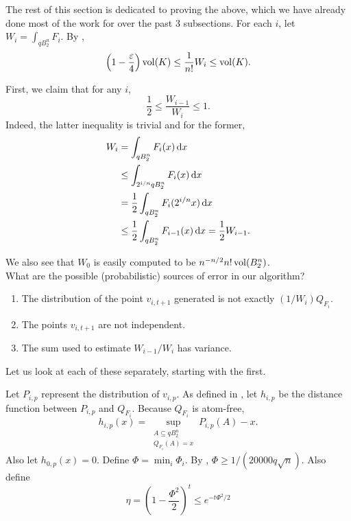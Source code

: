 The rest of this section is dedicated to proving the above, which we have already done most of the work for over the past 3 subsections. For each $i$, let $W_i = \int_{qB_2^n} F_i$. By , 
\[ \left(1-\frac{\varepsilon}{4}\right) \operatorname{vol}(K) \leq \frac{1}{n!}W_i \leq \operatorname{vol}(K). \]

First, we claim that for any $i$,
\[ \frac{1}{2} \leq \frac{W_{i-1}}{W_i} \leq 1. \]
Indeed, the latter inequality is trivial and for the former,
\begin{align*}
	W_i &= \int_{qB_2^n} F_i(x)\operatorname{d}\!{x} \\
		&\leq \int_{2^{i/n}qB_2^n} F_i(x)\operatorname{d}\!{x} \\
		&= \frac{1}{2} \int_{qB_2^n} F_i(2^{i/n}x)\operatorname{d}\!{x} \\
		&\leq \frac{1}{2} \int_{qB_2^n} F_{i-1}(x)\operatorname{d}\!{x} = \frac{1}{2} W_{i-1}.
\end{align*}

We also see that $W_0$ is easily computed to be $n^{-n/2}n!\operatorname{vol}(B_2^n)$.\\

What are the possible (probabilistic) sources of error in our algorithm?
\begin{enumerate}
	\item The distribution of the point $v_{i,t+1}$ generated is not exactly $(1/W_i)Q_{F_i}$.
	\item The points $v_{i,t+1}$ are not independent.
	\item The sum used to estimate $W_{i-1}/W_i$ has variance.
\end{enumerate}

Let us look at each of these separately, starting with the first.

Let $P_{i,p}$ represent the distribution of $v_{i,p}$. As defined in , let $h_{i,p}$ be the distance function between $P_{i,p}$ and $Q_{F_i}$. Because $Q_{F_i}$ is atom-free,
\[ h_{i,p}(x) = \sup_{\substack{A\subseteq qB_2^n \\ Q_{F_i}(A) = x}} P_{i,p}(A) - x. \]
Also let $h_{0,p}(x)=0$. Define $\Phi=\min_i\Phi_i$. By , $\Phi \geq 1/(20000q\sqrt{n})$. Also define
\[ \eta = \left(1-\frac{\Phi^2}{2}\right)^t \leq e^{-t\Phi^2/2} \] %

